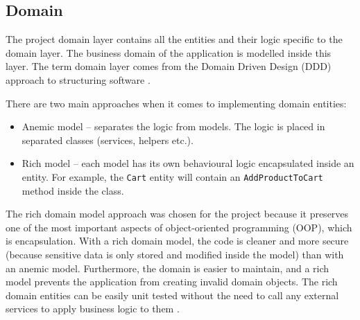 \documentclass[a4paper,twoside,12pt]{book}
\begin{document}
\subsection{Domain}

The project domain layer contains all the entities and their logic specific to the domain layer. The business domain of the application is modelled inside this layer. The term domain layer comes from the Domain Driven Design (DDD) approach to structuring software \cite{bib:cleanArchitectureImpl}. 

There are two main approaches when it comes to implementing domain entities:
\begin{itemize}
    \item Anemic model -- separates the logic from models. The logic is placed in separated classes (services, helpers etc.).
    \item Rich model -- each model has its own behavioural logic encapsulated inside an entity.  For example, the \lstinline|Cart| entity will contain an \lstinline|AddProductToCart| method inside the class.
\end{itemize}

The rich domain model approach was chosen for the project because it preserves one of the most important aspects of object-oriented programming (OOP), which is encapsulation. With a rich domain model, the code is cleaner and more secure (because sensitive data is only stored and modified inside the model) than with an anemic model. Furthermore, the domain is easier to maintain, and a rich model prevents the application from creating invalid domain objects. The rich domain entities can be easily unit tested without the need to call any external services to apply business logic to them \cite{bib:richAnemic}.
\end{document}
